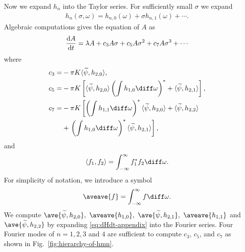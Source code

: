 Now we expand $h_{n}$ into the Taylor series.
For sufficiently small $\sigma$ we expand 
\begin{align}
  h_{n}(\sigma,\omega)
  = h_{n,0}(\omega) + \sigma h_{n,1}(\omega) + \cdots.
  \label{eq:Taylor-expansion-hn}
\end{align}
Algebraic computations gives the equation of $A$ as
\begin{align}
  \frac{{\rm d}A}{{\rm d}t}
  = \lambda A + c_{3} A \sigma + c_{5} A \sigma^{2} + c_{7} A \sigma^{3} + \cdots
\end{align}
where
\begin{align}
\begin{aligned}
  c_{3}=&-\pi K\langle\widetilde{\psi},h_{2,0}\rangle,\\
  c_{5}=&-\pi K\left[\langle\widetilde{\psi},h_{2,0}\rangle\left(\int h_{1,0}\diff\omega\right)^{*}+\langle\widetilde{\psi},h_{2,1}\rangle\right],\\
  c_{7}=&-\pi K\left[\left(\int h_{1,1} \diff\omega\right)^{*}\langle\widetilde\psi,h_{2,0}\rangle+\langle\widetilde\psi,h_{2,2}\rangle\right.\\
  &+\left.\left(\int h_{1,0} \diff\omega\right)^{*}\langle\widetilde\psi,h_{2,1}\rangle\right],
  \label{eq:c3c5c7}
\end{aligned}
\end{align}
and
\begin{align}
  \langle f_{1}, f_{2} \rangle
  = \int_{-\infty}^{\infty} f_{1}^{\ast} f_{2} \diff\omega.
\end{align}
For simplicity of notation, we introduce a symbol
\begin{equation}
  \aveave{f} = \int_{-\infty}^{\infty} f \diff\omega.
\end{equation}
We compute
$\ave{ \widetilde{\psi}, h_{2,0}},~
\aveave{h_{1,0}}, ~
\ave{ \widetilde{\psi}, h_{2,1}}, ~
\aveave{h_{1,1}}$
and $\ave{ \widetilde\psi, h_{2,2}}$
by expanding \eqref{eq:dHdt-appendix} into the Fourier series.
Four Fourier modes 
  of $n=1, 2, 3$ and $4$
are sufficient to compute $c_{3}$, $c_{5}$, and $c_{7}$
  as shown in Fig.~\ref{fig:hierarchy-of-hmn}.


